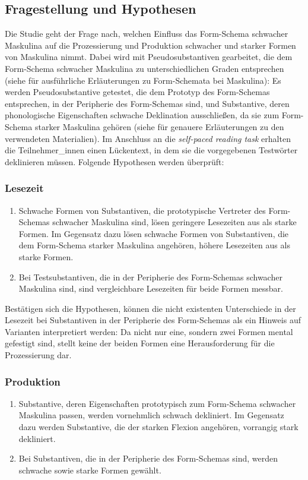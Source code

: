 \subsection{Fragestellung und Hypothesen}
\label{lesehypo}

Die Studie geht der Frage nach, welchen Einfluss das Form-Schema schwacher Maskulina auf die Prozessierung und Produktion schwacher und starker Formen von Maskulina nimmt. Dabei wird mit Pseudosubstantiven gearbeitet, die dem Form-Schema schwacher Maskulina zu unterschiedlichen Graden entsprechen (siehe  für ausführliche Erläuterungen zu Form-Schemata bei Maskulina): Es werden Pseudosubstantive getestet, die dem Prototyp des Form-Schemas entsprechen, in der Peripherie des Form-Schemas sind, und Substantive, deren phonologische Eigenschaften schwache Deklination ausschließen, da sie zum Form-Schema starker Maskulina gehören (siehe  für genauere Erläute\-rungen zu den verwendeten Materialien). Im Anschluss an die \textit{self-paced reading task} erhalten die Teilnehmer\_innen einen Lückentext, in dem sie die vorgegebenen Testwörter deklinieren müssen. Folgende Hypothesen werden überprüft:

\subsubsection{Lesezeit}

\begin{enumerate} 
\item Schwache Formen von Substantiven, die prototypische Vertreter des Form-Schemas schwacher Maskulina sind, lösen geringere Lesezeiten aus als starke Formen. Im Gegensatz dazu lösen schwache Formen von Substantiven, die dem Form-Schema starker Maskulina angehören, höhere Lesezeiten aus als starke Formen.
\item Bei Testsubstantiven, die in der Peripherie des Form-Schemas schwacher Maskulina sind, sind vergleichbare Lesezeiten für beide Formen messbar.
\end{enumerate}

Bestätigen sich die Hypothesen, können die nicht existenten Unterschiede in der Lesezeit bei Substantiven in der Peripherie des Form-Schemas als ein Hinweis auf Varianten interpretiert werden: Da nicht nur eine, sondern zwei Formen mental gefestigt sind, stellt keine der beiden Formen eine Herausforderung für die Prozessierung dar.

\subsubsection{Produktion}
\begin{enumerate} 
\item Substantive, deren Eigenschaften prototypisch zum Form-Schema schwacher Maskulina passen, werden vornehmlich schwach dekliniert. Im Gegensatz dazu werden Substantive, die der starken Flexion angehören, vorrangig stark dekliniert.
\item Bei Substantiven, die in der Peripherie des Form-Schemas sind, werden schwache sowie starke Formen gewählt.
\end{enumerate}

